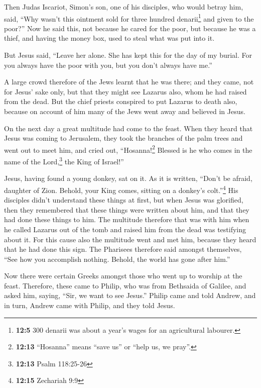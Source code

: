  Then Judas Iscariot, Simon's son, one of his disciples,
who would betray him, said,  ``Why wasn't this ointment
sold for three hundred denarii\footnote{\textbf{12:5} 300 denarii was
  about a year's wages for an agricultural labourer.} and given to the
poor?''  Now he said this, not because he cared for the
poor, but because he was a thief, and having the money box, used to
steal what was put into it.

 But Jesus said, ``Leave her alone. She has kept this for
the day of my burial.  For you always have the poor with
you, but you don't always have me.''

 A large crowd therefore of the Jews learnt that he was
there; and they came, not for Jesus' sake only, but that they might see
Lazarus also, whom he had raised from the dead.  But the
chief priests conspired to put Lazarus to death also, 
because on account of him many of the Jews went away and believed in
Jesus.

 On the next day a great multitude had come to the feast.
When they heard that Jesus was coming to Jerusalem,  they
took the branches of the palm trees and went out to meet him, and cried
out, ``Hosanna!\footnote{\textbf{12:13} ``Hosanna'' means ``save us'' or
  ``help us, we pray''.} Blessed is he who comes in the name of the
Lord,\footnote{\textbf{12:13} Psalm 118:25-26} the King of Israel!''

 Jesus, having found a young donkey, sat on it. As it is
written,  ``Don't be afraid, daughter of Zion. Behold,
your King comes, sitting on a donkey's colt.''\footnote{\textbf{12:15}
  Zechariah 9:9}  His disciples didn't understand these
things at first, but when Jesus was glorified, then they remembered that
these things were written about him, and that they had done these things
to him.  The multitude therefore that was with him when
he called Lazarus out of the tomb and raised him from the dead was
testifying about it.  For this cause also the multitude
went and met him, because they heard that he had done this sign.
 The Pharisees therefore said amongst themselves, ``See
how you accomplish nothing. Behold, the world has gone after him.''

 Now there were certain Greeks amongst those who went up
to worship at the feast.  Therefore, these came to
Philip, who was from Bethsaida of Galilee, and asked him, saying, ``Sir,
we want to see Jesus.''  Philip came and told Andrew, and
in turn, Andrew came with Philip, and they told Jesus.

